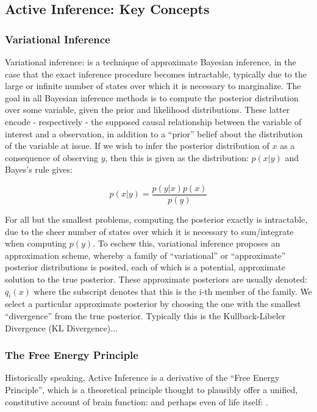 \documentclass[onecolumn]{IEEEtran}
\begin{document}
\subsection{Active Inference: Key Concepts} 

\vspace{12pt}
\subsubsection{Variational Inference}
Variational inference: \textcite{Variational-Inference-Reviews} is a technique of approximate Bayesian inference, in the case that the exact inference procedure becomes intractable, typically due to the large or infinite number of states over which it is necessary to marginalize. The goal in all Bayesian inference methods is to compute the posterior distribution over some variable, given the prior and likelihood distributions. These latter encode - respectively - the supposed causal relationship between the variable of interest and a observation, in addition to a ``prior'' belief about the distribution of the variable at issue. If we wish to infer the posterior distribution of $x$ as a consequence of observing $y$, then this is given as the distribution: $p(x | y)$ and Bayes's rule gives: 

$$ p(x | y) = \frac{p(y | x)p(x)}{p(y)} $$

For all but the smallest problems, computing the posterior exactly is intractable, due to the sheer number of states over which it is necessary to sum/integrate when computing $p(y)$. To eschew this, variational inference proposes an approximation scheme, whereby a family of ``variational'' or ``approximate'' posterior distributions is posited, each of which is a potential, approximate solution to the true posterior. These approximate posteriors are usually denoted: $q_i(x)$ where the subscript denotes that this is the i-th member of the family. We select a particular approximate posterior by choosing the one with the smallest ``divergence'' from the true posterior. Typically this is the Kullback-Libeler Divergence (KL Divergence)...

\vspace{12pt}
\subsubsection{The Free Energy Principle}

Historically speaking, Active Inference is a derivative of the ``Free Energy Principle'', which is a theoretical principle thought to plausibly offer a unified, constitutive account of brain function: \textcite{FEP-Rough-Guide-Brain} and perhaps even of life itself: \textcite{Life-As-We-Know-It}. 
\end{document}
